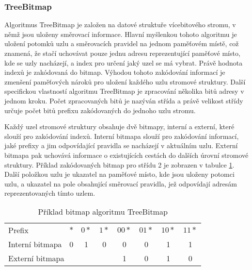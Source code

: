 \subsubsection{TreeBitmap} %

Algoritmus TreeBitmap je založen na datové struktuře vícebitového stromu, v němž jsou uloženy směrovací informace.
Hlavní myšlenkou tohoto algoritmu je uložení potomků uzlu a směrovacích pravidel na jednom paměťovém místě, což znamená, že stačí uchovávat pouze jednu
adresu reprezentující paměťové místo, kde se uzly nacházejí, a index pro určení jaký uzel se má vybrat. Právě
hodnota indexů je zakódovaná do bitmap.
Výhodou tohoto zakódování informací je zmenšení paměťových nároků pro uložení každého uzlu stromové struktury.
Další specifickou vlastností algoritmu TreeBitmap je zpracování několika bitů adresy v jednom kroku.
Počet zpracovaných bitů je nazýván střída a právě velikost střídy určuje počet bitů prefixu zakódovaných do jednoho uzlu stromu.

Každý uzel stromové struktury obsahuje dvě bitmapy, interní a externí, které slouží pro zakódování indexů.
Interní bitmapa slouží pro zakódování informací, jaké prefixy a jim odpovídající pravidla se nacházejí v aktuálním uzlu.
Externí bitmapa pak uchovává informace o existujících cestách do dalších úrovní stromové struktury.
Příklad zakódovaných bitmap pro střídu 2 je zobrazen v tabulce \ref{tab:tbm-bitmaps}.
Další položkou uzlu je ukazatel na paměťové místo, kde jsou uloženy potomci uzlu, a ukazatel na pole obsahující směrovací pravidla, jež odpovídají adresám reprezentovaných tímto uzlem.

\begin{table}
	\center
    \begin{tabular}{|l||c|c|c|c|c|c|c|}
    \hline
    Prefix & $*$ & $0*$ & $1*$ & $00*$ & $01*$ & $10*$ & $11*$ \\ \hhline{|=#=|=|=|=|=|=|=|}
    Interní bitmapa & 0 & 1 & 0 & 0 & 0 & 1 & 1 \\ \hline
    \multicolumn{4}{|l|}{Externí bitmapa} & 1 & 0 & 1 & 0 \\ \hline
    \end{tabular}
    \caption{Příklad bitmap algoritmu TreeBitmap}
    \label{tab:tbm-bitmaps}
\end{table}

